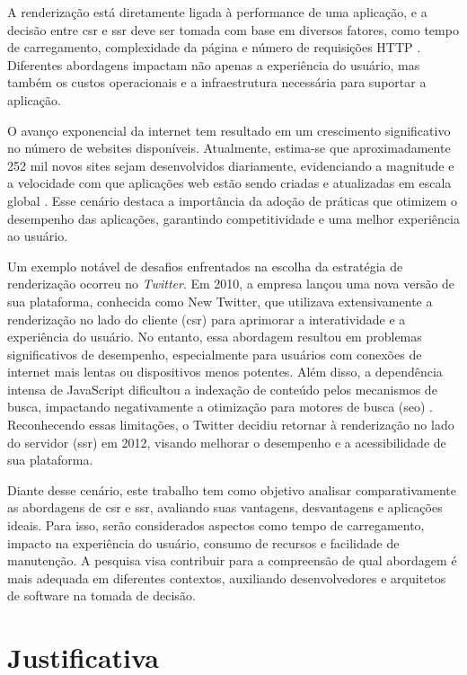A renderização está diretamente ligada à performance de uma aplicação, e a decisão entre \acrshort{csr} e \acrshort{ssr} deve ser tomada com base em diversos fatores, como tempo de carregamento, complexidade da página e número de requisições HTTP \cite{webPerformance}. Diferentes abordagens impactam não apenas a experiência do usuário, mas também os custos operacionais e a infraestrutura necessária para suportar a aplicação.

O avanço exponencial da internet tem resultado em um crescimento significativo no número de websites disponíveis. Atualmente, estima-se que aproximadamente 252 mil novos sites sejam desenvolvidos diariamente, evidenciando a magnitude e a velocidade com que aplicações web estão sendo criadas e atualizadas em escala global \cite{dataInternetUsage}. Esse cenário destaca a importância da adoção de práticas que otimizem o desempenho das aplicações, garantindo competitividade e uma melhor experiência ao usuário.

Um exemplo notável de desafios enfrentados na escolha da estratégia de renderização ocorreu no \emph{Twitter}. Em 2010, a empresa lançou uma nova versão de sua plataforma, conhecida como New Twitter, que utilizava extensivamente a renderização no lado do cliente (\acrshort{csr}) para aprimorar a interatividade e a experiência do usuário. No entanto, essa abordagem resultou em problemas significativos de desempenho, especialmente para usuários com conexões de internet mais lentas ou dispositivos menos potentes. Além disso, a dependência intensa de JavaScript dificultou a indexação de conteúdo pelos mecanismos de busca, impactando negativamente a otimização para motores de busca (\acrshort{seo}) \cite{twitter}. Reconhecendo essas limitações, o Twitter decidiu retornar à renderização no lado do servidor (\acrshort{ssr}) em 2012, visando melhorar o desempenho e a acessibilidade de sua plataforma.

Diante desse cenário, este trabalho tem como objetivo analisar comparativamente as abordagens de \acrshort{csr} e \acrshort{ssr}, avaliando suas vantagens, desvantagens e aplicações ideais. Para isso, serão considerados aspectos como tempo de carregamento, impacto na experiência do usuário, consumo de recursos e facilidade de manutenção. A pesquisa visa contribuir para a compreensão de qual abordagem é mais adequada em diferentes contextos, auxiliando desenvolvedores e arquitetos de software na tomada de decisão.


\section{Justificativa}


